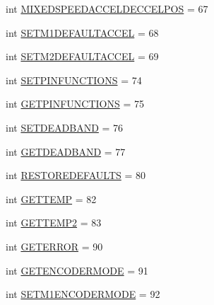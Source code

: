 \begin{DoxyCompactItemize}
\item 
int \mbox{\hyperlink{classtoxic__hardware_1_1roboclaw__3_1_1Roboclaw_1_1Cmd_a30cc75003a8d5bc716aef28f316174f4}{M\+I\+X\+E\+D\+S\+P\+E\+E\+D\+A\+C\+C\+E\+L\+D\+E\+C\+C\+E\+L\+P\+OS}} = 67
\item 
int \mbox{\hyperlink{classtoxic__hardware_1_1roboclaw__3_1_1Roboclaw_1_1Cmd_a58a545204a0df366fdc87d0f5be41fc0}{S\+E\+T\+M1\+D\+E\+F\+A\+U\+L\+T\+A\+C\+C\+EL}} = 68
\item 
int \mbox{\hyperlink{classtoxic__hardware_1_1roboclaw__3_1_1Roboclaw_1_1Cmd_a4641384c4279e5469e1658c768956038}{S\+E\+T\+M2\+D\+E\+F\+A\+U\+L\+T\+A\+C\+C\+EL}} = 69
\item 
int \mbox{\hyperlink{classtoxic__hardware_1_1roboclaw__3_1_1Roboclaw_1_1Cmd_a0038406619934114793ed744b352a256}{S\+E\+T\+P\+I\+N\+F\+U\+N\+C\+T\+I\+O\+NS}} = 74
\item 
int \mbox{\hyperlink{classtoxic__hardware_1_1roboclaw__3_1_1Roboclaw_1_1Cmd_a2d797bf95e4febe4b3b6b5ace42400cb}{G\+E\+T\+P\+I\+N\+F\+U\+N\+C\+T\+I\+O\+NS}} = 75
\item 
int \mbox{\hyperlink{classtoxic__hardware_1_1roboclaw__3_1_1Roboclaw_1_1Cmd_a473dc616d63cd06a3e09c73ce1622f81}{S\+E\+T\+D\+E\+A\+D\+B\+A\+ND}} = 76
\item 
int \mbox{\hyperlink{classtoxic__hardware_1_1roboclaw__3_1_1Roboclaw_1_1Cmd_aeecde73b79be340729647ba9e5fcb747}{G\+E\+T\+D\+E\+A\+D\+B\+A\+ND}} = 77
\item 
int \mbox{\hyperlink{classtoxic__hardware_1_1roboclaw__3_1_1Roboclaw_1_1Cmd_ae3df67bf8e3c9bf14b5c6aef9d06430e}{R\+E\+S\+T\+O\+R\+E\+D\+E\+F\+A\+U\+L\+TS}} = 80
\item 
int \mbox{\hyperlink{classtoxic__hardware_1_1roboclaw__3_1_1Roboclaw_1_1Cmd_a73c91975f9b88c9f094b0fb0f9947f4a}{G\+E\+T\+T\+E\+MP}} = 82
\item 
int \mbox{\hyperlink{classtoxic__hardware_1_1roboclaw__3_1_1Roboclaw_1_1Cmd_a17e151c522e0d133d2640a66bf483c7d}{G\+E\+T\+T\+E\+M\+P2}} = 83
\item 
int \mbox{\hyperlink{classtoxic__hardware_1_1roboclaw__3_1_1Roboclaw_1_1Cmd_a902a86118ed630c45aead64b567be4e5}{G\+E\+T\+E\+R\+R\+OR}} = 90
\item 
int \mbox{\hyperlink{classtoxic__hardware_1_1roboclaw__3_1_1Roboclaw_1_1Cmd_a4e654ec397b1745472d5e87df78b9a79}{G\+E\+T\+E\+N\+C\+O\+D\+E\+R\+M\+O\+DE}} = 91
\item 
int \mbox{\hyperlink{classtoxic__hardware_1_1roboclaw__3_1_1Roboclaw_1_1Cmd_a0ebbf9388c096edda037ef2940ff8939}{S\+E\+T\+M1\+E\+N\+C\+O\+D\+E\+R\+M\+O\+DE}} = 92

\end{DoxyCompactItemize}
